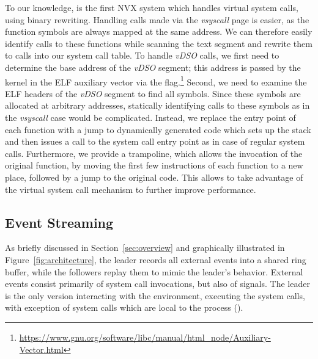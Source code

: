 To our knowledge, \vx is the first NVX system which handles virtual
system calls, using binary rewriting. 
Handling calls made via the \textit{vsyscall} page is easier, as
the function symbols are always mapped at the same address.  
We can therefore easily identify calls to these functions while
scanning the text segment and rewrite them to calls into our system
call table.
To handle \textit{vDSO} calls, we first need to
determine the base address of the \textit{vDSO} segment; this address
is passed by the kernel in the ELF auxiliary vector via the
flag.\footnote{\url{https://www.gnu.org/software/libc/manual/html_node/Auxiliary-Vector.html}}
Second, we need to examine the ELF headers of the \textit{vDSO}
segment to find all symbols.  Since these symbols are allocated at
arbitrary addresses, statically identifying calls to these symbols as
in the \textit{vsyscall} case would be complicated. Instead, we
replace the entry point of each function with a jump to dynamically
generated code which sets up the stack and then issues a call to the
\vx system call entry point as in case of regular system
calls. Furthermore, we provide a trampoline, which allows the
invocation of the original function, by moving the first few
instructions of each function to a new place, followed by a jump to
the original code. This allows \vx to take advantage of the virtual
system call mechanism to further improve performance.




\subsection{Event Streaming}
\label{sec:streaming}

As briefly discussed in Section~\ref{sec:overview} and graphically
illustrated in Figure~\ref{fig:architecture}, the leader records all
external events into a shared ring buffer, while the followers replay
them to mimic the leader's behavior.  External events consist
primarily of system call invocations, but also of signals.  The leader
is the only version interacting with the environment, \ie executing
the system calls, with exception of system calls which are local to
the process (\eg {}). %

